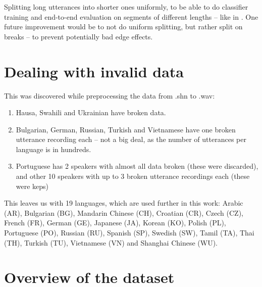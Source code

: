 \documentclass[bsc,frontabs,twoside,singlespacing,parskip,deptreport]{infthesis}
\begin{document}
{{    Splitting long utterances into shorter ones uniformly, to be able to do classifier training and end-to-end evaluation on segments of different lengths -- like in \cite{Snyder_et_al_2018}. One future improvement would be to not do uniform splitting, but rather split on breaks -- to prevent potentially bad edge effects.
  }

  \section{Dealing with invalid data}{
    This was discovered while preprocessing the data from .shn to .wav:
    \begin{enumerate}
      \item {Hausa, Swahili and Ukrainian have broken data.}
      \item {Bulgarian, German, Russian, Turkish and Vietnamese have one broken utterance recording each -- not a big deal, as the number of utterances per language is in hundreds.}
      \item {Portuguese has 2 speakers with almost all data broken (these were discarded), and other 10 speakers with up to 3 broken utterance recordings each (these were keps)}
    \end{enumerate}

    This leaves us with 19 languages, which are used further in this work: Arabic (AR), Bulgarian (BG), Mandarin Chinese (CH), Croatian (CR), Czech (CZ), French (FR), German (GE), Japanese (JA), Korean (KO), Polish (PL), Portuguese (PO), Russian (RU), Spanish (SP), Swedish (SW), Tamil (TA), Thai (TH), Turkish (TU), Vietnamese (VN) and Shanghai Chinese (WU).
  }

  \section{Overview of the dataset}{

  }
}
\end{document}
